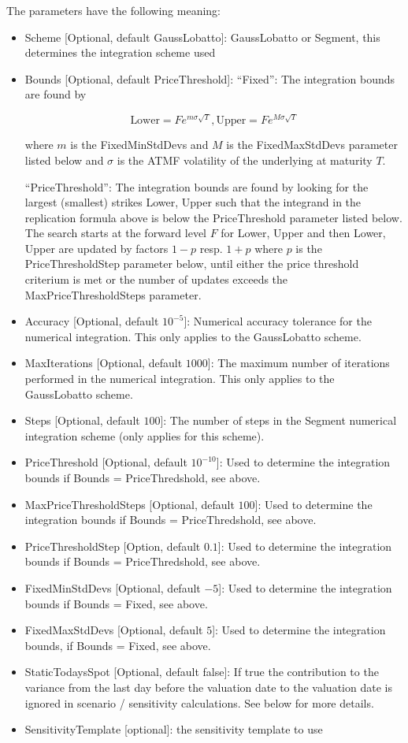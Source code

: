 The parameters have the following meaning:

\begin{itemize}
\item Scheme [Optional, default GaussLobatto]: GaussLobatto or Segment, this determines the integration scheme used
\item Bounds [Optional, default PriceThreshold]: ``Fixed'': The integration bounds are found by
  
  $$
  \text{Lower} = F e ^ {m \sigma \sqrt{T}},  \text{Upper} = F e ^ {M \sigma \sqrt{T}}
  $$

  where $m$ is the FixedMinStdDevs and $M$ is the FixedMaxStdDevs parameter listed below and $\sigma$ is the ATMF
  volatility of the underlying at maturity $T$.

  ``PriceThreshold'': The integration bounds are found by looking for the largest (smallest) strikes Lower, Upper such
  that the integrand in the replication formula above is below the PriceThreshold parameter listed below. The search
  starts at the forward level $F$ for Lower, Upper and then Lower, Upper are updated by factors $1-p$ resp. $1+p$ where
  $p$ is the PriceThresholdStep parameter below, until either the price threshold criterium is met or the number of
  updates exceeds the MaxPriceThresholdSteps parameter.

\item Accuracy [Optional, default $10^{-5}$]: Numerical accuracy tolerance for the numerical integration. This only
  applies to the GaussLobatto scheme.
\item MaxIterations [Optional, default $1000$]: The maximum number of iterations performed in the numerical
  integration. This only applies to the GaussLobatto scheme.
\item Steps [Optional, default $100$]: The number of steps in the Segment numerical integration scheme (only applies for
  this scheme).
\item PriceThreshold [Optional, default $10^{-10}$]: Used to determine the integration bounds if Bounds = PriceThredshold, see above.
\item MaxPriceThresholdSteps [Optional, default $100$]: Used to determine the integration bounds if Bounds = PriceThredshold, see above.
\item PriceThresholdStep [Option, default $0.1$]: Used to determine the integration bounds if Bounds = PriceThredshold, see above.
\item FixedMinStdDevs [Optional, default $-5$]: Used to determine the integration bounds if Bounds = Fixed, see above.
\item FixedMaxStdDevs [Optional, default $5$]: Used to determine the integration bounds, if Bounds = Fixed, see above.
\item StaticTodaysSpot [Optional, default false]: If true the contribution to the variance from the last day before the
  valuation date to the valuation date is ignored in scenario / sensitivity calculations. See below for more details.
\item SensitivityTemplate [optional]: the sensitivity template to use 
\end{itemize}

